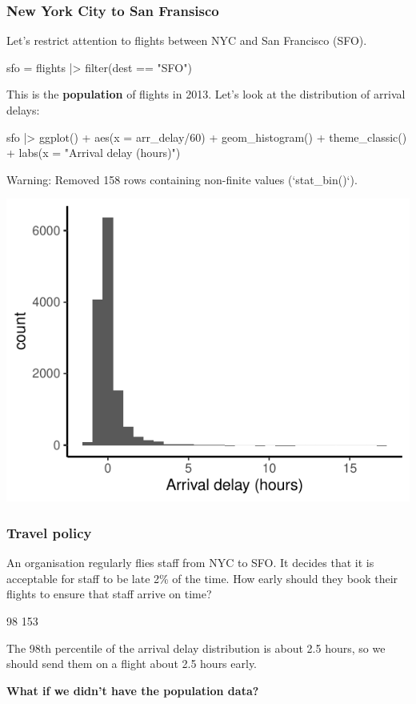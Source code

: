 \documentclass[a4paper]{article}
\begin{document}
\subsubsection{New York City to San Fransisco}
Let's restrict attention to flights between NYC and San Francisco (SFO).
\begin{Schunk}
\begin{Sinput}
sfo = flights |> filter(dest == "SFO")
\end{Sinput}
\end{Schunk}
This is the \textbf{population} of flights in 2013. Let's look at the distribution of arrival delays:
\begin{Schunk}
\begin{Sinput}
sfo |> ggplot() + aes(x = arr_delay/60) +
  geom_histogram() + 
  theme_classic() +
  labs(x = "Arrival delay (hours)")
\end{Sinput}
\begin{Soutput}
Warning: Removed 158 rows containing non-finite values (`stat_bin()`).
\end{Soutput}


{\centering \includegraphics[width=\maxwidth]{figure/listings-unnamed-chunk-176-1} 

}

\end{Schunk}
\subsubsection{Travel policy}
An organisation regularly flies staff from NYC to SFO. It decides that it is acceptable for staff to be late 2\% of the time. How early should they book their flights to ensure that staff arrive on time?
\begin{Schunk}
\begin{Soutput}
98%
153 
\end{Soutput}
\end{Schunk}
The 98th percentile of the arrival delay distribution is about 2.5 hours, so we should send them on a flight about 2.5 hours early.
\begin{greenbox}
	\textbf{What if we didn't have the population data?}
\end{greenbox}
\end{document}
